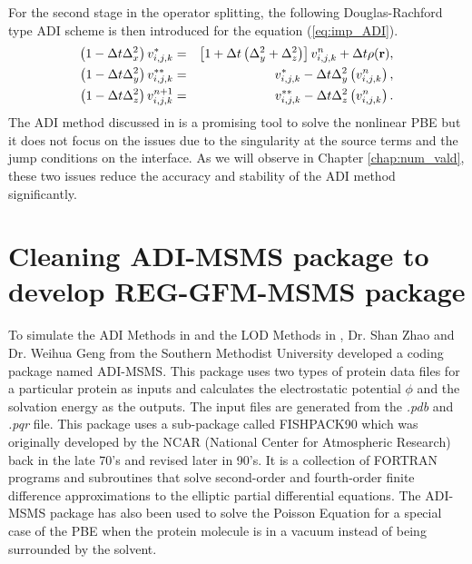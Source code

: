 For the second stage in the operator splitting, the following Douglas-Rachford type ADI scheme is then introduced for the equation (\ref{eq:imp_ADI})\cite{Geng2013_Fully}.   
\begin{eqnarray}
		\left(1- \Delta t \Delta_x^2\right)v_{i,j,k}^{*}&=&\left[1+ \Delta t \left(\Delta_y^2+\Delta_z^2 \right)\right]v_{i,j,k}^{n}+\Delta t \rho({\bf r}),\label{eq_ADI1}\nonumber \\ 
		\left(1-\Delta t \Delta_y^2\right)v_{i,j,k}^{**}&=&v_{i,j,k}^{*}- \Delta t \Delta_y^2\left(v_{i,j,k}^{n}\right),\label{GFM-ADI2}\\
		\left(1- \Delta t \Delta_z^2\right)v_{i,j,k}^{n+1}&=&v_{i,j,k}^{**}- \Delta t \Delta_z^2\left(v_{i,j,k}^{n}\right).\label{GFM-ADI3}\nonumber
\end{eqnarray}
The ADI method discussed in \cite{Geng2013_Fully} is a promising tool to solve the nonlinear PBE but it does not focus on the issues due to the singularity at the source terms and the jump conditions on the interface. As we will observe in Chapter \ref{chap:num_vald}, these two issues reduce the accuracy and stability of the ADI method significantly.  
       


\section{Cleaning ADI-MSMS package to develop REG-GFM-MSMS package}	
To simulate the ADI Methods in \cite{Geng2013_Fully} and the LOD Methods in \cite{Wilson2016}, Dr. Shan Zhao and Dr. Weihua Geng from the Southern Methodist University developed a coding package named ADI-MSMS. This package uses two types of protein data files for a particular protein as inputs and calculates the electrostatic potential $\phi$ and the solvation energy as the outputs. The input files are generated from the {\it .pdb} and {\it .pqr } file. This package uses a sub-package called  FISHPACK90 which was originally developed by the NCAR (National Center for Atmospheric Research) back in the late 70's and revised later in 90's. It is a collection of FORTRAN programs and subroutines that solve second-order and fourth-order finite difference approximations to  the elliptic partial differential equations. The ADI-MSMS package has also been used to solve the Poisson Equation for a special case of the PBE when the protein molecule is in a vacuum instead of being surrounded by the solvent.

